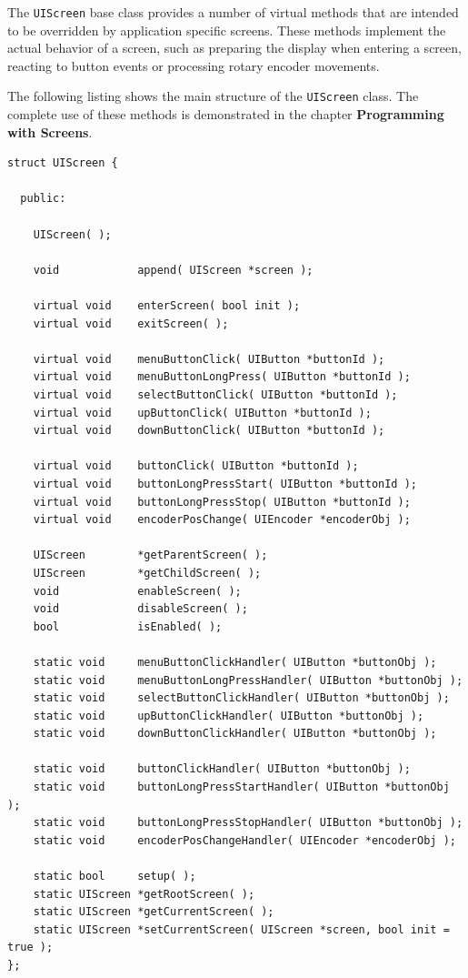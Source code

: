 The \texttt{UIScreen} base class provides a number of virtual methods that are
intended to be overridden by application specific screens. These methods
implement the actual behavior of a screen, such as preparing the display when
entering a screen, reacting to button events or processing rotary encoder
movements.

The following listing shows the main structure of the \texttt{UIScreen} class.
The complete use of these methods is demonstrated in the chapter
\textbf{Programming with Screens}.
\lstset{language=c++, style=codesnippetstyle}
\begin{lstlisting}
struct UIScreen {

  public:

    UIScreen( );

    void            append( UIScreen *screen );

    virtual void    enterScreen( bool init );
    virtual void    exitScreen( );

    virtual void    menuButtonClick( UIButton *buttonId );
    virtual void    menuButtonLongPress( UIButton *buttonId );
    virtual void    selectButtonClick( UIButton *buttonId );
    virtual void    upButtonClick( UIButton *buttonId );
    virtual void    downButtonClick( UIButton *buttonId );

    virtual void    buttonClick( UIButton *buttonId );
    virtual void    buttonLongPressStart( UIButton *buttonId );
    virtual void    buttonLongPressStop( UIButton *buttonId );
    virtual void    encoderPosChange( UIEncoder *encoderObj );

    UIScreen        *getParentScreen( );
    UIScreen        *getChildScreen( );
    void            enableScreen( );
    void            disableScreen( );
    bool            isEnabled( );

    static void     menuButtonClickHandler( UIButton *buttonObj );
    static void     menuButtonLongPressHandler( UIButton *buttonObj );
    static void     selectButtonClickHandler( UIButton *buttonObj );
    static void     upButtonClickHandler( UIButton *buttonObj );
    static void     downButtonClickHandler( UIButton *buttonObj );

    static void     buttonClickHandler( UIButton *buttonObj );
    static void     buttonLongPressStartHandler( UIButton *buttonObj );
    static void     buttonLongPressStopHandler( UIButton *buttonObj );
    static void     encoderPosChangeHandler( UIEncoder *encoderObj );

    static bool     setup( );
    static UIScreen *getRootScreen( );
    static UIScreen *getCurrentScreen( );
    static UIScreen *setCurrentScreen( UIScreen *screen, bool init = true );
};

\end{lstlisting}
\FloatBarrier

